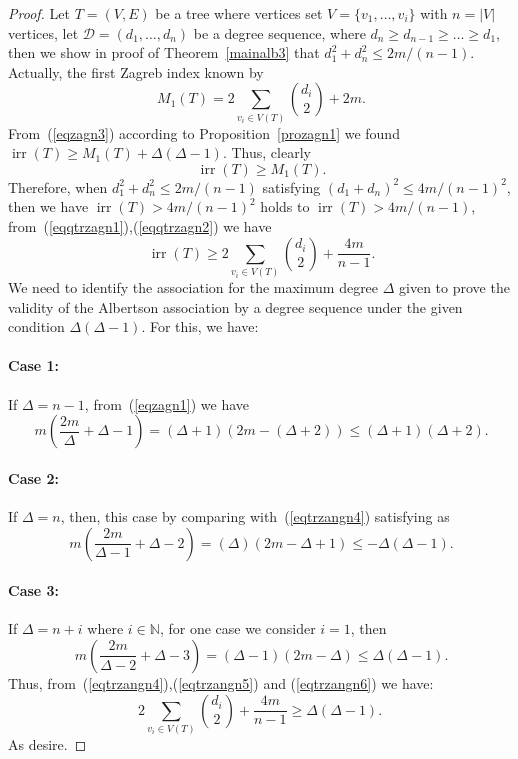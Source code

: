 \documentclass[12pt]{amsart}
\newcommand{\irr}{\operatorname{irr}}
\newcommand{\case}[1]{\paragraph*{Case #1:}}
\begin{document}
\begin{proof}
Let $T=(V,E)$ be a tree where vertices set $V=\{v_1,\dots,v_i\}$ with $n=|V|$ vertices, let $\mathscr{D}=(d_1,\dots,d_n)$ be a degree sequence, where $d_n\geqslant d_{n-1}\geqslant \dots \geqslant d_1$, then we show in proof of Theorem~\ref{mainalb3} that $d_1^2+d_n^2\leq 2m/(n-1)$. Actually, the first Zagreb index\cite{Liu} known by
\begin{equation}~\label{eqqtrzagn1}
    M_1(T)=2\sum_{v_i\in V(T)}\binom{d_i}{2}+2m.
\end{equation}
From~(\ref{eqzagn3}) according to Proposition~\ref{prozagn1} we found $\irr(T)\geq M_1(T)+\Delta(\Delta-1)$. Thus, clearly
\begin{equation}~\label{eqqtrzagn2}
    \irr(T)\geq M_1(T).
\end{equation}
Therefore, when $d_1^2+d_n^2\leq 2m/(n-1)$ satisfying $(d_1+d_n)^2\leq 4m/(n-1)^2$, then we have $\irr(T)>4m/(n-1)^2$ holds to $\irr(T)>4m/(n-1)$, from~(\ref{eqqtrzagn1}),(\ref{eqqtrzagn2}) we have
\begin{equation}~\label{eqqtrzagn3}
\irr(T)\geqslant 2\sum_{v_i\in V(T)}\binom{d_i}{2}+\frac{4m}{n-1}.
\end{equation}
We need to identify the association for the maximum degree $\Delta$ given to prove the validity of the Albertson association by a degree sequence under the given condition $\Delta(\Delta-1)$. For this, we have: 
\case{1} If $\Delta=n-1$, from~(\ref{eqzagn1}) we have
\begin{equation}~\label{eqtrzangn4}
    m\left(\frac{2m}{\Delta}+\Delta-1\right)=(\Delta+1)(2m-(\Delta+2))\leq (\Delta+1)(\Delta+2).
\end{equation}
\case{2} If $\Delta=n$, then, this case by comparing with~(\ref{eqtrzangn4}) satisfying as
\begin{equation}~\label{eqtrzangn5}
    m\left(\frac{2m}{\Delta-1}+\Delta-2\right)=(\Delta)(2m-\Delta+1)\leq -\Delta(\Delta-1).
\end{equation}
\case{3} If $\Delta=n+i$ where $i\in \mathbb{N}$, for one case we consider $i=1$, then 
\begin{equation}~\label{eqtrzangn6}
    m\left(\frac{2m}{\Delta-2}+\Delta-3\right)=(\Delta-1)(2m-\Delta)\leq \Delta(\Delta-1).
\end{equation}
Thus, from~(\ref{eqtrzangn4}),(\ref{eqtrzangn5}) and (\ref{eqtrzangn6}) we have:
\[
2\sum_{v_i\in V(T)}\binom{d_i}{2}+\frac{4m}{n-1}\geqslant \Delta(\Delta-1).
\]
As desire.
\end{proof}
\end{document}

